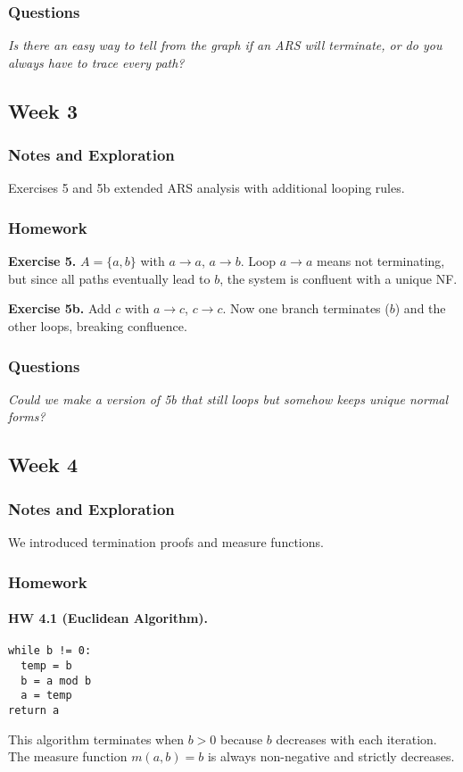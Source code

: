 \documentclass[11pt]{article}
\begin{document}
\subsubsection{Questions}
\emph{Is there an easy way to tell from the graph if an ARS will terminate, or do you always have to trace every path?}

\subsection{Week 3}

\subsubsection{Notes and Exploration}
Exercises 5 and 5b extended ARS analysis with additional looping rules.

\subsubsection{Homework}
\textbf{Exercise 5.}  
$A=\{a,b\}$ with $a\to a$, $a\to b$.  
Loop $a\to a$ means not terminating, but since all paths eventually lead to $b$, the system is confluent with a unique NF.

\textbf{Exercise 5b.}  
Add $c$ with $a\to c$, $c\to c$.  
Now one branch terminates ($b$) and the other loops, breaking confluence.

\subsubsection{Questions}
\emph{Could we make a version of 5b that still loops but somehow keeps unique normal forms?}

\subsection{Week 4}

\subsubsection{Notes and Exploration}
We introduced termination proofs and measure functions.

\subsubsection{Homework}
\paragraph{HW 4.1 (Euclidean Algorithm).}
\begin{verbatim}
while b != 0:
  temp = b
  b = a mod b
  a = temp
return a
\end{verbatim}
This algorithm terminates when $b>0$ because $b$ decreases with each iteration.  
The measure function $m(a,b)=b$ is always non-negative and strictly decreases.
\end{document}
